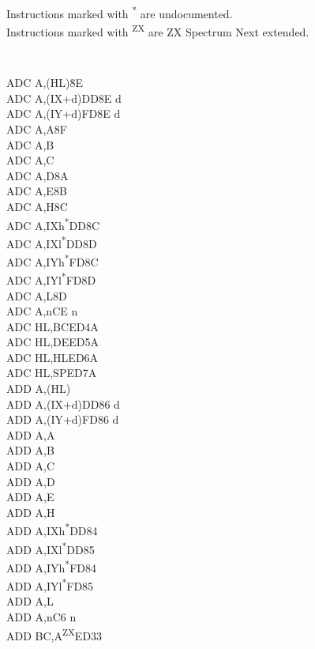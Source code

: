 \documentclass[twoside,openright,a4paper]{book}
\begin{document}
Instructions marked with \textsuperscript{*} are undocumented.\\
Instructions marked with \textsuperscript{ZX} are ZX Spectrum Next extended.
\setlength\columnsep{2em}
\begin{multicols}{3}
{
	\tt 
	\small
	\begin{tabbing}
	ADC A,(HL){\qquad}{\qquad}\=8E\\
	ADC A,(IX+d)\>DD8E d\\
	ADC A,(IY+d)\>FD8E d\\
	ADC A,A\>8F\\
	ADC A,B\\
	ADC A,C\\
	ADC A,D\>8A\\
	ADC A,E\>8B\\
	ADC A,H\>8C\\
	ADC A,IXh\textsuperscript{*}\>DD8C\\
	ADC A,IXl\textsuperscript{*}\>DD8D\\
	ADC A,IYh\textsuperscript{*}\>FD8C\\
	ADC A,IYl\textsuperscript{*}\>FD8D\\
	ADC A,L\>8D\\
	ADC A,n\>CE n\\
	ADC HL,BC\>ED4A\\
	ADC HL,DE\>ED5A\\
	ADC HL,HL\>ED6A\\
	ADC HL,SP\>ED7A\\
	ADD A,(HL)\\
	ADD A,(IX+d)\>DD86 d\\
	ADD A,(IY+d)\>FD86 d\\
	ADD A,A\\
	ADD A,B\\
	ADD A,C\\
	ADD A,D\\
	ADD A,E\\
	ADD A,H\\
	ADD A,IXh\textsuperscript{*}\>DD84\\
	ADD A,IXl\textsuperscript{*}\>DD85\\
	ADD A,IYh\textsuperscript{*}\>FD84\\
	ADD A,IYl\textsuperscript{*}\>FD85\\
	ADD A,L\\
	ADD A,n\>C6 n\\
	ADD BC,A\textsuperscript{ZX}\>ED33\\

\end{tabbing}}
\end{multicols}
\end{document}
